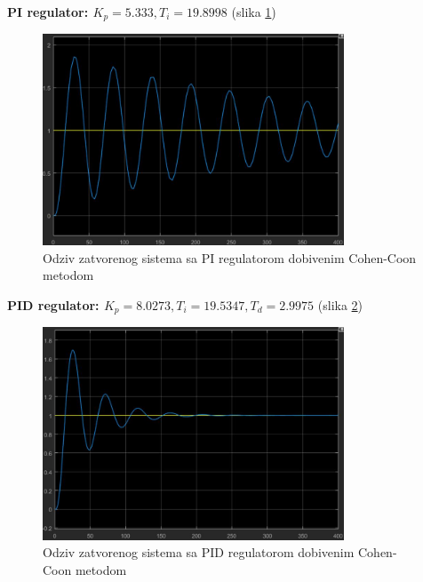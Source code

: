 \textbf{PI regulator: $K_p=5.333, T_i=19.8998$} (slika \ref{fig:z2_23})

\begin{figure} [H]
  \centering
  \includegraphics[width=0.8\textwidth]{z2_23}
  \caption{Odziv zatvorenog sistema sa PI regulatorom dobivenim Cohen-Coon metodom}
  \label{fig:z2_23}
\end{figure} 

\textbf{PID regulator: $K_p=8.0273, T_i=19.5347, T_d=2.9975$} (slika \ref{fig:z2_24})

\begin{figure} [H]
  \centering
  \includegraphics[width=0.8\textwidth]{z2_24}
  \caption{Odziv zatvorenog sistema sa PID regulatorom dobivenim Cohen-Coon metodom}
  \label{fig:z2_24}
\end{figure}

